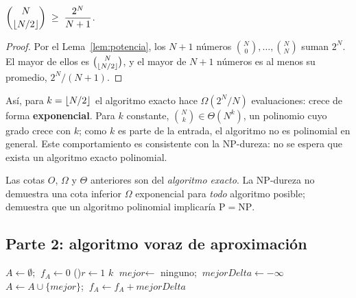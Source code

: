 \begin{lema}\label{lem:binom}
$\displaystyle\binom{N}{\lfloor N/2\rfloor} \;\ge\; \frac{2^N}{N+1}$.
\end{lema}
\begin{proof}
Por el Lema~\ref{lem:potencia}, los $N+1$ números $\binom{N}{0},\dots,\binom{N}{N}$ suman $2^N$. El mayor de ellos es $\binom{N}{\lfloor N/2\rfloor}$, y el mayor de $N+1$ números es al menos su promedio, $2^N/(N+1)$.
\end{proof}

Así, para $k=\lfloor N/2\rfloor$ el algoritmo exacto hace $\Omega(2^N/N)$ evaluaciones: crece de forma \textbf{exponencial}. Para $k$ constante, $\binom{N}{k}\in\Theta(N^k)$, un polinomio cuyo grado crece con $k$; como $k$ es parte de la entrada, el algoritmo no es polinomial en general. Este comportamiento es consistente con la NP-dureza: no se espera que exista un algoritmo exacto polinomial.

\begin{observacion}
Las cotas $O$, $\Omega$ y $\Theta$ anteriores son del \emph{algoritmo exacto}. La NP-dureza no demuestra una cota inferior $\Omega$ exponencial para \emph{todo} algoritmo posible; demuestra que un algoritmo polinomial implicaría $\mathrm{P}=\mathrm{NP}$.
\end{observacion}

\subsection{Parte 2: algoritmo voraz de aproximación}\label{sec:voraz}

\begin{algorithm}[H]
\caption{\textsc{SelecciónVoraz}$(V, f, k)$}\label{alg:voraz}
$A \leftarrow \emptyset$; $\ f_A \leftarrow 0$ 
\For(){$r\leftarrow 1$ \KwTo $k$}{
  $\textit{mejor}\leftarrow$ ninguno; $\ \textit{mejorDelta}\leftarrow -\infty$\;
  $A \leftarrow A\cup\{\textit{mejor}\}$; $\ f_A \leftarrow f_A + \textit{mejorDelta}$\;
}
\;
\end{algorithm}

